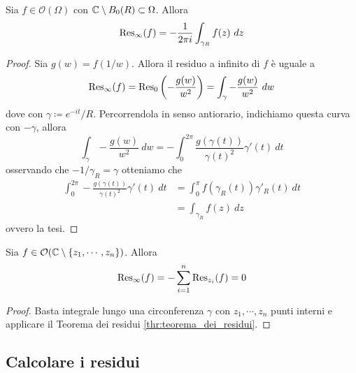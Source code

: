 \begin{lemma}
  Sia $f \in \mathcal{O}(\Omega)$ con $\mathbb{C} \setminus B_0(R) \subset \Omega$.
  Allora 
  \begin{equation*}
    \operatorname{Res}_\infty (f) = -\frac{1}{2\pi i } \int_{\gamma_R} f(z)\ dz
  \end{equation*}
  \label{lem:residuo_a_infinito}
\end{lemma}
\begin{proof}
  Sia $g(w) = f(1/w)$. Allora il residuo a infinito di $f$ è uguale a 
  \begin{equation*}
    \operatorname{Res}_\infty(f) = \operatorname{Res}_0\left(-\frac{g(w)}{w^2}  \right) = \int_{\gamma}
    -\frac{g(w)}{w^2}\ dw
  \end{equation*}
  dove con $\gamma \coloneqq e^{-it}/R$. Percorrendola in senso antiorario,
  indichiamo questa curva con $-\gamma$, allora
  \begin{equation*}
    \int_{\gamma} -\frac{g(w)}{w^2}\ dw  = - \int_{0}^{2\pi}
    \frac{g(\gamma(t))}{\gamma(t)^2} \gamma'(t)\ dt 
  \end{equation*}
  osservando che $-1/\gamma_R = \gamma$ otteniamo che 
  \begin{align*}
     \int_{0}^{2\pi} -\frac{g(\gamma(t))}{\gamma(t)^2} \gamma'(t)\ dt
     & = \int_{0}^{\pi} f(\gamma_R(t)) \gamma'_R(t) \ dt\\
     & = \int_{\gamma_R} f(z)\ dz
  \end{align*}
  ovvero la tesi.
\end{proof}

\begin{corollary}
  Sia $f \in \mathcal{O}(\mathbb{C} \setminus \left\{ z_1, \cdots, z_n \right\})$. Allora 
    \begin{equation*}
      \operatorname{Res}_\infty(f) = - \sum_{i=1}^{n} \operatorname{Res}_{z_i}(f) = 0
    \end{equation*}
\end{corollary}
\begin{proof}
  Basta integrale lungo una circonferenza $\gamma$ con $z_1, \cdots, z_n$ punti
  interni e applicare il Teorema dei residui \ref{thr:teorema_dei_residui}.
\end{proof}


\subsection{\textcolor{AnComp}{\textbf{Calcolare i residui}}}

